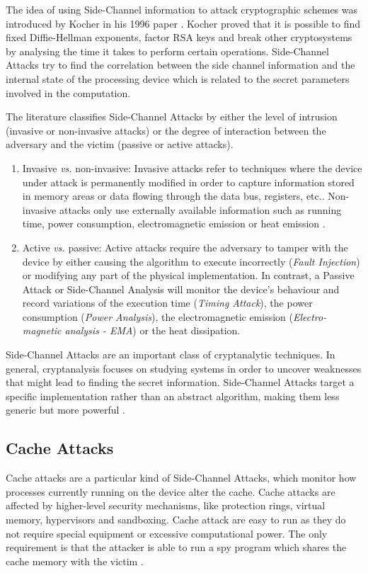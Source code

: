 \documentclass[10pt,a4paper,twoside]{book}
\begin{document}
The idea of using Side-Channel information to attack cryptographic schemes was introduced by Kocher in his 1996 paper \cite{kocher1996timing}. Kocher proved that it is possible to find fixed Diffie-Hellman exponents, factor RSA keys and break other cryptosystems by analysing the time it takes to perform certain operations. Side-Channel Attacks try to find the correlation between the side channel information and the internal state of the processing device which is related to the secret parameters involved in the computation. 

The literature classifies Side-Channel Attacks by either the level of intrusion (invasive or non-invasive attacks) or the degree of interaction between the adversary and the victim (passive or active attacks).
\begin{enumerate}
\item Invasive \textit{vs.} non-invasive: Invasive attacks refer to techniques where the device under attack is permanently modified in order to capture information stored in memory areas or data flowing through the data bus, registers, etc.\cite{Tria2011}. Non-invasive attacks only use externally available information such as running time, power consumption, electromagnetic emission or heat emission \cite{standaert2010introduction}.
\item Active \textit{vs.} passive: Active attacks require the adversary to tamper with the device by either causing the algorithm to execute incorrectly (\textit{Fault Injection}) or modifying any part of the physical implementation. In contrast, a Passive Attack or Side-Channel Analysis will monitor the device's behaviour and record variations of the execution time (\textit{Timing Attack}), the power consumption (\textit{Power Analysis}), the electromagnetic emission (\textit{Electro-magnetic analysis - EMA}) or the heat dissipation. 
\end{enumerate}

Side-Channel Attacks are an important class of cryptanalytic techniques. In general, cryptanalysis focuses on studying systems in order to uncover weaknesses that might lead to finding the secret information. Side-Channel Attacks target a specific implementation rather than an abstract algorithm, making them less generic but more powerful \cite{standaert2010introduction}.

\subsection{Cache Attacks}
Cache attacks are a particular kind of Side-Channel Attacks, which monitor how processes currently running on the device alter the cache. Cache attacks are affected by higher-level security mechanisms, like protection rings, virtual memory, hypervisors and sandboxing. Cache attack are easy to run as they do not require special equipment or excessive computational power. The only requirement is that the attacker is able to run a spy program which shares the cache memory with the victim \cite{oren2015spy}.
\end{document}
